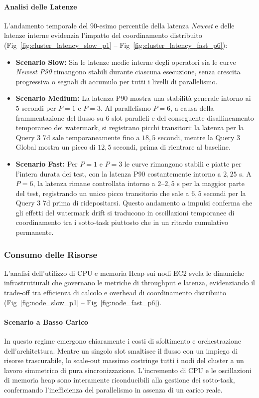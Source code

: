 \documentclass[conference]{IEEEtran}
\begin{document}
\paragraph{Analisi delle Latenze}
L'andamento temporale del $90$-esimo percentile della latenza \textit{Newest} e delle latenze interne evidenzia l'impatto del coordinamento distribuito (Fig~\ref{fig:cluster_latency_slow_p1} -- Fig~\ref{fig:cluster_latency_fast_p6}):
\begin{itemize}
    \item \textbf{Scenario Slow:} Sia le latenze medie interne degli operatori sia le curve \textit{Newest P90} rimangono stabili durante ciascuna esecuzione, senza crescita progressiva o segnali di accumulo per tutti i livelli di parallelismo.
    \item \textbf{Scenario Medium:} La latenza P90 mostra una stabilità generale intorno ai $5$ secondi per $P=1$ e $P=3$. Al parallelismo $P=6$, a causa della frammentazione del flusso su 6 slot paralleli e del conseguente disallineamento temporaneo dei watermark, si registrano picchi transitori: la latenza per la Query 3 7d sale temporaneamente fino a $18,5$ secondi, mentre la Query 3 Global mostra un picco di $12,5$ secondi, prima di rientrare al baseline.
    \item \textbf{Scenario Fast:} Per $P=1$ e $P=3$ le curve rimangono stabili e piatte per l'intera durata dei test, con la latenza P90 costantemente intorno a $2,25$ s. A $P=6$, la latenza rimane controllata intorno a $2\text{--}2,5$ s per la maggior parte del test, registrando un unico picco transitorio che sale a $6,5$ secondi per la Query 3 7d prima di ridepositarsi. Questo andamento a impulsi conferma che gli effetti del watermark drift si traducono in oscillazioni temporanee di coordinamento tra i sotto-task piuttosto che in un ritardo cumulativo permanente.
\end{itemize}

\subsubsection{Consumo delle Risorse}\label{subsubsec:resource_node}

L'analisi dell'utilizzo di CPU e memoria Heap sui nodi EC2 svela le dinamiche infrastrutturali che governano le metriche di throughput e latenza, evidenziando il trade-off tra efficienza di calcolo e overhead di coordinamento distribuito (Fig~\ref{fig:node_slow_p1} -- Fig~\ref{fig:node_fast_p6}).

\paragraph{Scenario a Basso Carico}
In questo regime emergono chiaramente i costi di sfoltimento e orchestrazione dell'architettura. Mentre un singolo slot smaltisce il flusso con un impiego di risorse trascurabile, lo scale-out massimo costringe tutti i nodi del cluster a un lavoro simmetrico di pura sincronizzazione. L'incremento di CPU e le oscillazioni di memoria heap sono interamente riconducibili alla gestione dei sotto-task, confermando l'inefficienza del parallelismo in assenza di un carico reale.
\end{document}

